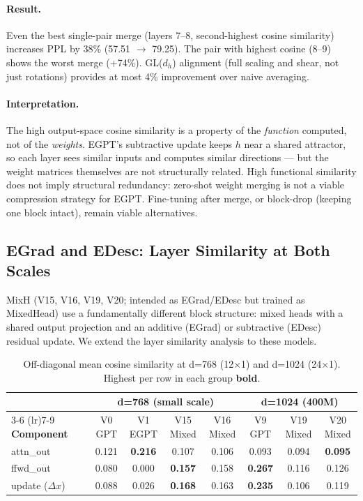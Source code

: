 \paragraph{Result.}
Even the best single-pair merge (layers 7--8, second-highest cosine similarity) increases
PPL by 38\% (57.51 $\to$ 79.25).
The pair with highest cosine (8--9) shows the worst merge (+74\%).
GL($d_h$) alignment (full scaling and shear, not just rotations) provides at most 4\%
improvement over naive averaging.

\paragraph{Interpretation.}
The high output-space cosine similarity is a property of the \emph{function} computed,
not of the \emph{weights}.
EGPT's subtractive update keeps $h$ near a shared attractor, so each layer sees similar
inputs and computes similar directions --- but the weight matrices themselves are not
structurally related.
High functional similarity does not imply structural redundancy:
zero-shot weight merging is not a viable compression strategy for EGPT.
Fine-tuning after merge, or block-drop (keeping one block intact), remain viable alternatives.

\subsection{EGrad and EDesc: Layer Similarity at Both Scales}
\label{sec:layer_sim_egrad}

MixH (V15, V16, V19, V20; intended as EGrad/EDesc but trained as MixedHead) use a fundamentally different block structure:
mixed heads with a shared output projection and an additive (EGrad) or subtractive (EDesc)
residual update.
We extend the layer similarity analysis to these models.

\begin{table}[h]
\centering
\caption{Off-diagonal mean cosine similarity at d=768 (12$\times$1) and d=1024 (24$\times$1).
  Highest per row in each group \textbf{bold}.}
\label{tab:layer_sim_egrad}
\small
\setlength{\tabcolsep}{5pt}
\begin{tabular}{lc@{\quad}cccc@{\quad\quad}ccc}
\toprule
& & \multicolumn{4}{c}{\textbf{d=768 (small scale)}} & \multicolumn{3}{c}{\textbf{d=1024 (400M)}} \\
\cmidrule(lr){3-6} \cmidrule(lr){7-9}
\textbf{Component} & & V0 GPT & V1 EGPT & V15 Mixed & V16 Mixed & V9 GPT & V19 Mixed & V20 Mixed \\
\midrule
attn\_out  & & 0.121 & \textbf{0.216} & 0.107 & 0.106 & 0.093 & 0.094 & \textbf{0.095} \\
ffwd\_out  & & 0.080 & 0.000 & \textbf{0.157} & 0.158 & \textbf{0.267} & 0.116 & 0.126 \\
update ($\Delta x$) & & 0.088 & 0.026 & \textbf{0.168} & 0.163 & \textbf{0.235} & 0.106 & 0.119 \\
\bottomrule
\end{tabular}
\end{table}

